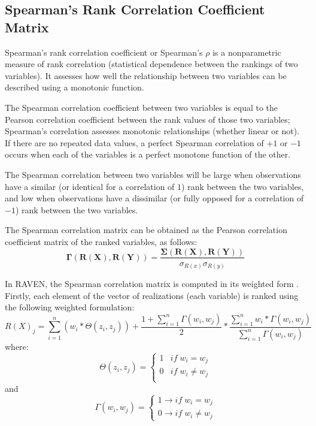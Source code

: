 \subsection{Spearman's Rank Correlation Coefficient Matrix}
Spearman's rank correlation coefficient or Spearman's $\rho$ is a nonparametric measure of rank correlation
 (statistical dependence between the rankings of two variables). 
 It assesses how well the relationship between two variables can be described using a monotonic function.

The Spearman correlation coefficient between two variables is equal to the Pearson correlation coefficient 
between the rank values of those two variables; Spearman's 
correlation assesses monotonic relationships (whether linear or not). If there are no repeated data values, 
a perfect Spearman correlation of $+1$ or $-1$ occurs when each of the variables is a perfect monotone
function of the other.

The Spearman correlation between two variables will be large when observations have a similar 
(or identical for a correlation of $1$) rank between the two variables, and low when observations
 have a dissimilar (or fully opposed for a correlation of $-1$) rank between the two variables.

The Spearman correlation  matrix  can be obtained as the Pearson correlation coefficient matrix of the ranked variables, as follows:
\begin{equation}
\boldsymbol{\Gamma}(\boldsymbol{R(X)},\boldsymbol{R(Y)}) = \frac{\boldsymbol{\Sigma}(\boldsymbol{R(X)},\boldsymbol{R(Y)})}{\sigma_{R(x)} \sigma_{R(y)}}
\end{equation}

In RAVEN, the Spearman correlation  matrix  is computed in its weighted form \cite{Bailey2018}. 
Firstly, each element of the vector of realizations (each variable) is  ranked using the following weighted formulation:
\begin{equation}
    R(X)_j = \sum_{i=1}^n (w_i *\Theta(z_i, z_j)) + \frac{1+\sum_{i=1}^{n}  \Gamma(w_i, w_j)} {2} * \frac{\sum_{i=1}^{n} w_i*\Gamma(w_i, w_j)}{\sum_{i=1}^{n} \Gamma(w_i, w_j)}
\end{equation}
where: 
\begin{equation}
\Theta (z_i, z_j)=\left\{\begin{matrix}
1 & if \; w_i = w_j  \\
 0 & if \; w_i \neq w_j \\
\end{matrix}\right.
\end{equation}
and
\begin{equation}
     \Gamma (w_i, w_j) =\begin{cases}1 \rightarrow if \;  w_i = w_j \\ 0  \rightarrow if \; w_i \neq  w_j\end{cases}
\end{equation}

